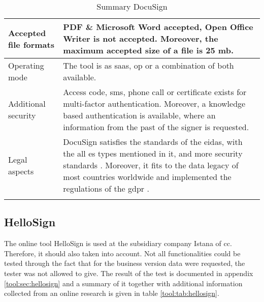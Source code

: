 \begin{longtable}{|p{4cm}|p{10cm}|}
		Accepted file formats & PDF \& Microsoft Word accepted, Open Office Writer is not accepted. Moreover, the maximum accepted size of a file is 25 \gls{mb}. \parencite{docusign2018formats}\\ \hline
		Operating mode & The tool is as \gls{saas}, \gls{op} or a combination of both available. \parencite{docusign2018op,docusign2018saas} \\ \hline
		Additional security & Access code, \gls{sms}, phone call or certificate exists for multi-factor authentication. Moreover, a knowledge based authentication is available, where an information from the past of the signer is requested. \parencite{docusign2018security} \\ \hline
		Legal aspects & DocuSign satisfies the standards of the \gls{eidas}, with the all \gls{es} types mentioned in it, and more security standards \parencite{docusign2018certificates,docusign2018legal,docusign2018es}. Moreover, it fits to the data legacy of most countries worldwide and implemented the regulations of the \gls{gdpr} \parencite{docusign2018global, docusign2018gdpr}. \\ \hline
	\caption{Summary DocuSign}
	\label{tool:tab:docusign}
	\end{longtable}


\subsection{HelloSign}
The online tool HelloSign is used at the subsidiary company Istana of \gls{cc}. Therefore, it should also taken into account. Not all functionalities could be tested through the fact that for the business version data were requested, the tester was not allowed to give. The result of the test is documented in appendix \ref{tool:sec:hellosign} and a summary of it together with additional information collected from an online research is given in table \ref{tool:tab:hellosign}.
	
